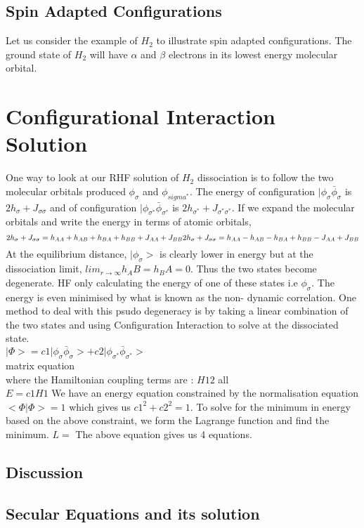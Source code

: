 \documentclass[11pt]{article}   	%
\begin{document}
	\subsection{Spin Adapted Configurations}
	Let us consider the example of $H_2$ to illustrate spin adapted configurations. The ground state of $H_2$ will have $\alpha$ and $\beta$ electrons in its lowest energy 
	molecular orbital. 
\section{Configurational Interaction Solution}
	One way to look at our RHF solution of $H_2$ dissociation is to follow the two molecular orbitals produced $\phi_{\sigma}$ and $\phi_{sigma^*}$. 
	The energy of configuration $|\phi_{\sigma} \bar{\phi}_{\sigma}$ is $2h_{\sigma} +J_{\sigma \sigma}$ and of configuration $|\phi_{\sigma^*} \bar{\phi}_{\sigma^*}$ is $2h_{\sigma^*} +J_{\sigma^* \sigma^*}$. If we expand the molecular orbitals and write the energy in terms of atomic orbitals, \\
	\begin{equation}
	2h_{\sigma} +J_{\sigma \sigma}=h_{AA}+h_{AB}+h_{BA}+h_{BB}+J_{AA}+J_{BB}\\
	2h_{\sigma} +J_{\sigma \sigma}=h_{AA}-h_{AB}-h_{BA}+h_{BB}-J_{AA}+J_{BB}\\
	\end{equation}
	At the equilibrium distance, $|\phi_{\sigma}>$ is clearly lower in energy but at the dissociation limit, $lim_{r\rightarrow\infty} h_AB=h_BA=0$. Thus the two states
	become degenerate. HF only calculating the energy of one of these states i.e $\phi_{\sigma}$. The energy is even minimised by what is known as the non-
	dynamic correlation. One method to deal with this psudo degeneracy is by taking a linear combination of the two states and using Configuration Interaction 
	to solve at the dissociated state. \\
	$|\Phi>=c1 |\phi_{\sigma}\bar{\phi}_{\sigma}>+c2|\phi_{\sigma^*}\bar{\phi}_{\sigma^*}>$\\
	matrix equation\\
	where the Hamiltonian coupling terms are :
	$H12$ all \\
	$E=c1H1$
	We have an energy equation constrained by the normalisation equation $<\Phi|\Phi>=1$ which gives us $c1^2+c2^2=1$.
	To solve for the minimum in energy based on the above constraint, we form the Lagrange function and find the minimum. 
	$L=$
	The above equation gives us 4 equations.
	\subsection{Discussion}
	\subsection{Secular Equations and its solution}
\end{document}

